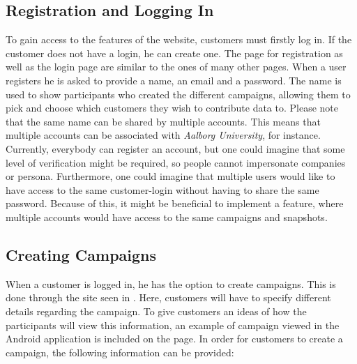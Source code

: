\subsection{Registration and Logging In}

To gain access to the features of the website, customers must firstly log in. If the customer does not have a login, he can create one. The page for registration as well as the login page are similar to the ones of many other pages. When a user registers he is asked to provide a name, an email and a password. The name is used to show participants who created the different campaigns, allowing them to pick and choose which customers they wish to contribute data to. Please note that the same name can be shared by multiple accounts. This means that multiple accounts can be associated with \emph{Aalborg University}, for instance. Currently, everybody can register an account, but one could imagine that some level of verification might be required, so people cannot impersonate companies or persona. Furthermore, one could imagine that multiple users would like to have access to the same customer-login without having to share the same password. Because of this, it might be beneficial to implement a feature, where multiple accounts would have access to the same campaigns and snapshots.



\subsection{Creating Campaigns}
\label{sub:creating_campaign}

When a customer is logged in, he has the option to create campaigns. This is done through the site seen in . Here, customers will have to specify different details regarding the campaign. To give customers an ideas of how the participants will view this information, an example of campaign viewed in the Android application is included on the page. In order for customers to create a campaign, the following information can be provided:

